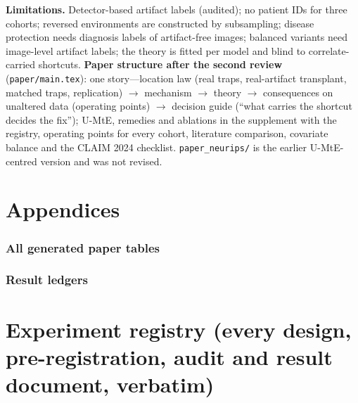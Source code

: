 \documentclass[10pt,a4paper]{article}
\begin{document}
\textbf{Limitations.} Detector-based artifact labels (audited); no patient IDs for three cohorts; reversed environments are
constructed by subsampling; disease protection needs diagnosis labels of artifact-free images; balanced variants need
image-level artifact labels; the theory is fitted per model and blind to correlate-carried shortcuts.
\textbf{Paper structure after the second review} (\texttt{paper/main.tex}): one story---location law (real traps,
real-artifact transplant, matched traps, replication) $\to$ mechanism $\to$ theory $\to$ consequences on unaltered data
(operating points) $\to$ decision guide (``what carries the shortcut decides the fix''); U-MtE, remedies and ablations in
the supplement with the registry, operating points for every cohort, literature comparison, covariate balance and the
CLAIM 2024 checklist. \texttt{paper\_neurips/} is the earlier U-MtE-centred version and was not revised.

\appendix
\part{Appendices}
\section{All generated paper tables}\label{app:tables}
{\small}
\section{Result ledgers}\label{app:resultsmd}

\part{Experiment registry (every design, pre-registration, audit and result document, verbatim)}\label{app:registry}
\setcounter{section}{0}

\end{document}
